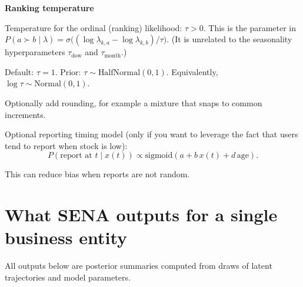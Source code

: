 \documentclass[11pt]{article}
\begin{document}
\textbf{Ranking temperature}

Temperature for the ordinal (ranking) likelihood: $\tau>0$.
This is the parameter in
$P(a\succ b\mid\lambda)=\sigma\bigl((\log\lambda_{k,a}-\log\lambda_{k,b})/\tau\bigr)$.
(It is unrelated to the seasonality hyperparameters $\tau_{\text{dow}}$ and $\tau_{\text{month}}$.)

Default: $\tau=1$.
Prior: $\tau \sim \text{HalfNormal}(0,1)$.
Equivalently, $\log \tau \sim \text{Normal}(0,1)$.

Optionally add rounding, for example a mixture that snaps to common increments.

Optional reporting timing model (only if you want to leverage the fact that users tend to report when stock is low):
\[
  P(\text{report at } t \mid x(t)) \propto \text{sigmoid}(a + b\,x(t) + d\,\text{age}).
\]

This can reduce bias when reports are not random.

\section{What SENA outputs for a single business entity}

All outputs below are posterior summaries computed from draws of latent trajectories
and model parameters.
\end{document}
